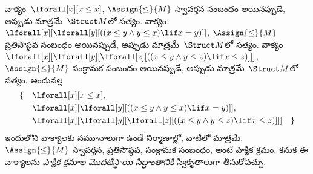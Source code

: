 \documentclass[../../../include/open-logic-section]{subfiles}
\begin{document}
\begin{ex}
వాక్యం~$\lforall[x][x \le x]$, $\Assign{\le}{M}$ స్వావర్తన సంబంధం
అయినప్పుడే, అప్పుడు మాత్రమే~$\Struct M$లో సత్యం. వాక్యం
$\lforall[x][\lforall[y][((x \le y \land y \le x) \lif x = y)]]$,
$\Assign{\le}{M}$ ప్రతిసౌష్ఠవ సంబంధం అయినప్పుడే, అప్పుడు మాత్రమే~$\Struct M$లో
సత్యం. వాక్యం $\lforall[x][\lforall[y][\lforall[z][((x \le y \land y \le z)
      \lif x \le z)]]]$, $\Assign{\le}{M}$ సంక్రామక సంబంధం అయినప్పుడే,
అప్పుడు మాత్రమే~$\Struct M$లో సత్యం. అందువల్ల
\begin{align*}
\{\quad &\lforall[x][x \le x], \\
   & \lforall[x][\lforall[y][((x \le y \land y \le
    x) \lif x = y)]], \\
   &\lforall[x][\lforall[y][\lforall[z][((x \le y
      \land y \le z) \lif x \le z)]]] \quad \}
\end{align*}
ఇందులోని వాక్యాలకు నమూనాలుగా ఉండే నిర్మాణాల్లో, వాటిలో మాత్రమే,~$\Assign{\le}{M}$ స్వావర్తన, ప్రతిసౌష్ఠవ,
సంక్రామక సంబంధం, అంటే పాక్షిక క్రమం. కనుక ఈ వాక్యాలను
\emph{పాక్షిక క్రమాల మొదటిస్థాయి సిద్ధాంతానికి} స్వీకృతాలుగా తీసుకోవచ్చు.
\end{ex}
\end{document}
